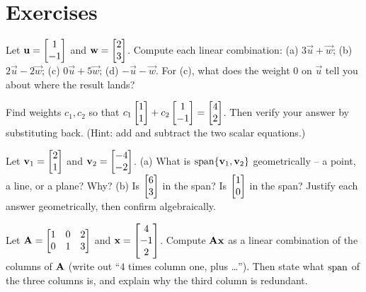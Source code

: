 \section{Exercises}

\begin{exercise}\label{ch03:ex-warmup}
Let $\mathbf{u} = \begin{bmatrix}1\\-1\end{bmatrix}$ and $\mathbf{w} = \begin{bmatrix}2\\3\end{bmatrix}$. Compute each linear combination:
(a) $3\vec{u} + \vec{w}$;\;
(b) $2\vec{u} - 2\vec{w}$;\;
(c) $0\vec{u} + 5\vec{w}$;\;
(d) $-\vec{u} - \vec{w}$.
For (c), what does the weight $0$ on $\vec{u}$ tell you about where the result lands?
\end{exercise}

\begin{exercise}\label{ch03:ex-find-weights}
Find weights $c_1, c_2$ so that $c_1\begin{bmatrix}1\\1\end{bmatrix} + c_2\begin{bmatrix}1\\-1\end{bmatrix} = \begin{bmatrix}4\\2\end{bmatrix}$. Then verify your answer by substituting back. (Hint: add and subtract the two scalar equations.)
\end{exercise}

\begin{exercise}\label{ch03:ex-membership}
Let $\mathbf{v}_1 = \begin{bmatrix}2\\1\end{bmatrix}$ and $\mathbf{v}_2 = \begin{bmatrix}-4\\-2\end{bmatrix}$.
(a) What is $\operatorname{span}\{\mathbf{v}_1,\mathbf{v}_2\}$ geometrically -- a point, a line, or a plane? Why?
(b) Is $\begin{bmatrix}6\\3\end{bmatrix}$ in the span? Is $\begin{bmatrix}1\\0\end{bmatrix}$ in the span? Justify each answer geometrically, then confirm algebraically.
\end{exercise}

\begin{exercise}\label{ch03:ex-column}
Let $\mathbf{A} = \begin{bmatrix} 1 & 0 & 2 \\ 0 & 1 & 3 \end{bmatrix}$ and $\mathbf{x} = \begin{bmatrix}4\\-1\\2\end{bmatrix}$. Compute $\mathbf{A}\mathbf{x}$ as a linear combination of the columns of $\mathbf{A}$ (write out ``$4$ times column one, plus \dots''). Then state what $\operatorname{span}$ of the three columns is, and explain why the third column is redundant.
\end{exercise}

